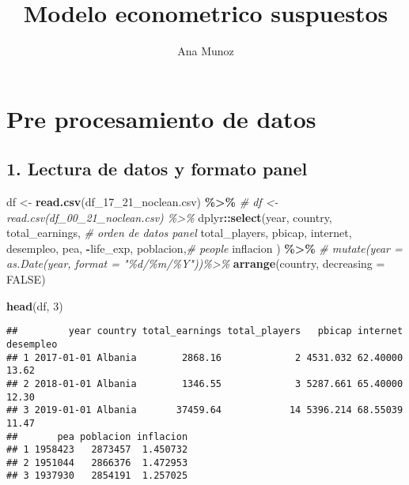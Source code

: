 \documentclass[
]{article}
\title{Modelo econometrico suspuestos}
\author{Ana Munoz}
\date{}
\newenvironment{Shaded}{\begin{snugshade}}{\end{snugshade}}
\newcommand{\AttributeTok}[1]{\textcolor[rgb]{0.13,0.29,0.53}{#1}}
\newcommand{\CommentTok}[1]{\textcolor[rgb]{0.56,0.35,0.01}{\textit{#1}}}
\newcommand{\ConstantTok}[1]{\textcolor[rgb]{0.56,0.35,0.01}{#1}}
\newcommand{\DecValTok}[1]{\textcolor[rgb]{0.00,0.00,0.81}{#1}}
\newcommand{\FunctionTok}[1]{\textcolor[rgb]{0.13,0.29,0.53}{\textbf{#1}}}
\newcommand{\NormalTok}[1]{#1}
\newcommand{\OtherTok}[1]{\textcolor[rgb]{0.56,0.35,0.01}{#1}}
\newcommand{\SpecialCharTok}[1]{\textcolor[rgb]{0.81,0.36,0.00}{\textbf{#1}}}
\newcommand{\StringTok}[1]{\textcolor[rgb]{0.31,0.60,0.02}{#1}}
\begin{document}
\maketitle

\section{Pre procesamiento de datos}\label{pre-procesamiento-de-datos}

\subsection{1. Lectura de datos y formato
panel}\label{lectura-de-datos-y-formato-panel}

\begin{Shaded}
\begin{Highlighting}[]
\NormalTok{df }\OtherTok{\textless{}{-}} \FunctionTok{read.csv}\NormalTok{(}\StringTok{\textquotesingle{}df\_17\_21\_noclean.csv\textquotesingle{}}\NormalTok{) }\SpecialCharTok{\%\textgreater{}\%}
\CommentTok{\# df \textless{}{-} read.csv(\textquotesingle{}df\_00\_21\_noclean.csv\textquotesingle{}) \%\textgreater{}\%}
\NormalTok{  dplyr}\SpecialCharTok{::}\FunctionTok{select}\NormalTok{(year, country, total\_earnings, }\CommentTok{\# orden de datos panel}
\NormalTok{         total\_players,}
\NormalTok{         pbicap, }
\NormalTok{         internet, }
\NormalTok{         desempleo,}
\NormalTok{         pea, }
         \SpecialCharTok{{-}}\NormalTok{life\_exp, }
\NormalTok{         poblacion,}\CommentTok{\# people}
\NormalTok{         inflacion}
\NormalTok{        ) }\SpecialCharTok{\%\textgreater{}\%}
  \CommentTok{\# mutate(year = as.Date(year, format = "\%d/\%m/\%Y"))\%\textgreater{}\%}
  \FunctionTok{arrange}\NormalTok{(country, }\AttributeTok{decreasing =} \ConstantTok{FALSE}\NormalTok{)}

\FunctionTok{head}\NormalTok{(df, }\DecValTok{3}\NormalTok{)}
\end{Highlighting}
\end{Shaded}

\begin{verbatim}
##         year country total_earnings total_players   pbicap internet desempleo
## 1 2017-01-01 Albania        2868.16             2 4531.032 62.40000     13.62
## 2 2018-01-01 Albania        1346.55             3 5287.661 65.40000     12.30
## 3 2019-01-01 Albania       37459.64            14 5396.214 68.55039     11.47
##       pea poblacion inflacion
## 1 1958423   2873457  1.450732
## 2 1951044   2866376  1.472953
## 3 1937930   2854191  1.257025
\end{verbatim}
\end{document}
